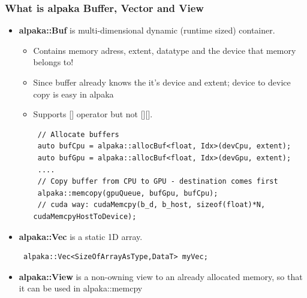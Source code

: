 \documentclass[9pt]{beamer}
\begin{document}
\begin{frame} [fragile]
\frametitle{What is alpaka Buffer, Vector and View}
\begin{itemize}
 \item \textbf{alpaka::Buf} is multi-dimensional dynamic (runtime sized) container.
 \begin{itemize}
 \item Contains memory adress, extent, datatype and the device that memory belongs to!
 \item Since buffer already knows the it's device and extent; device to device copy is easy in alpaka
 \item Supports [] operator but not [][].
 \lstset{basicstyle=\ttfamily\scriptsize}
 \begin{lstlisting}
 // Allocate buffers
 auto bufCpu = alpaka::allocBuf<float, Idx>(devCpu, extent);
 auto bufGpu = alpaka::allocBuf<float, Idx>(devGpu, extent);
 ....
 // Copy buffer from CPU to GPU - destination comes first
 alpaka::memcopy(gpuQueue, bufGpu, bufCpu);
 // cuda way: cudaMemcpy(b_d, b_host, sizeof(float)*N, cudaMemcpyHostToDevice);
 \end{lstlisting}
 \end{itemize}
 \item \textbf{alpaka::Vec} is a static 1D array.
 \begin{lstlisting}
 alpaka::Vec<SizeOfArrayAsType,DataT> myVec;
 \end{lstlisting}
 \item \textbf{alpaka::View} is a non-owning view to an already allocated memory, so that it can be used in alpaka::memcpy
\end{itemize}
    \end{frame}
\end{document}
